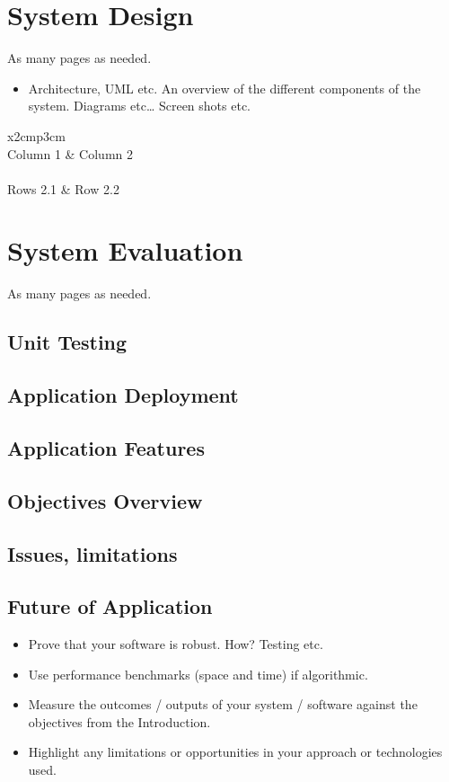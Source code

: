 \chapter{System Design}
As many pages as needed.
\begin{itemize}
\item Architecture, UML etc. An overview of the different components of the system. Diagrams etc… Screen shots etc.
\end{itemize}
\begin{table}[h]
  \centering
  \begin{tabular}{x{2cm}p{3cm}}
    \toprule \\
    Column 1 & Column 2 \\
    \midrule \\
    Rows 2.1 & Row 2.2 \\
    \bottomrule
  \end{tabular}
  \caption{A table.}
  \label{table:mytable}
\end{table}
\chapter{System Evaluation}
As many pages as needed.
\section{Unit Testing}
\section{Application Deployment}
\section{Application Features}
\section{Objectives Overview}
\section{Issues, limitations}
\section{Future of Application}
\begin{itemize}
\item Prove that your software is robust. How? Testing etc. 
\item Use performance benchmarks (space and time) if algorithmic.
\item Measure the outcomes / outputs of your system / software against the objectives from the Introduction.
\item Highlight any limitations or opportunities in your approach or technologies used.
\end{itemize}
